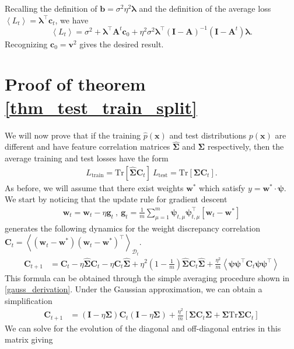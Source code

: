 \documentclass{article} %
\def\x{\bm x}
\def\w{\bm w}
\def\x{\mathbf x}
\def\w{\mathbf w}
\def\A{\mathbf A}
\def\I{\mathbf I}
\def\C{\mathbf C}
\def\g{\mathbf g}
\begin{document}
Recalling the definition of $\bm b = \sigma^2 \eta^2 \bm \lambda$ and the definition of the average loss $\left< L_t \right> = \bm\lambda^\top \bm c_t$, we have
\begin{equation}
    \left< L_t \right> = \sigma^2 +  \bm\lambda^\top \A^t \bm c_0 + \eta^2\sigma^2 \bm\lambda^\top (\I - \A)^{-1} \left( \I - \A^t \right) \bm\lambda .
\end{equation}
Recognizing $\bm c_0 = \mathbf{v}^2$ gives the desired result.

\section{Proof of theorem \ref{thm_test_train_split}}\label{app:test_train_split}

We will now prove that if the training $\hat{p}(\x)$ and test distributions $p(\x)$ are different and have feature correlation matrices $\bm{\hat\Sigma}$ and $\bm\Sigma$ respectively, then the average training and test losses have the form
\begin{align}
    L_{\text{train}} = \text{Tr}\left[ \bm{\hat \Sigma} \C_t \right] \ L_{\text{test}} = \text{Tr}\left[ \bm{ \Sigma} \C_t \right] .
\end{align}
As before, we will assume that there exist weights $\w^*$ which satisfy $y = \w^* \cdot \bm\psi$. We start by noticing that the update rule for gradient descent 
\begin{align}
    \w_t = \w_t - \eta \g_t \ , \ \g_t = \frac{1}{m} \sum_{\mu=1}^m \bm \psi_{t,\mu} \bm \psi_{t,\mu}^\top \left[ \w_t - \w^* \right]
\end{align}
generates the following dynamics for the weight discrepancy correlation $\C_t= \left<(\w_t-\w^*) (\w_t -\w^*)^\top \right>_{\mathcal D_t}$.
\begin{align}
    \C_{t+1} &= \C_t - \eta\bm{\hat \Sigma} \C_t - \eta \C_t \bm{\hat \Sigma} + \eta^2 \left(1-\frac{1}{m} \right) \bm{\hat\Sigma} \C_t \bm{\hat\Sigma} + \frac{\eta^2}{m} \left< \bm\psi \bm\psi^\top \C_t \bm\psi \bm\psi^\top \right>
\end{align}
This formula can be obtained through the simple averaging procedure shown in \ref{gauss_derivation}. Under the Gaussian approximation, we can obtain a simplification
\begin{align}
    \C_{t+1} &= (\I - \eta \bm\Sigma)\C_t(\I-\eta \bm\Sigma) + \frac{\eta^2}{m}\left[ \bm\Sigma\C_t \bm\Sigma + \bm\Sigma\text{Tr}\bm\Sigma \C_t \right]
\end{align}
We can solve for the evolution of the diagonal and off-diagonal entries in this matrix giving
\end{document}
